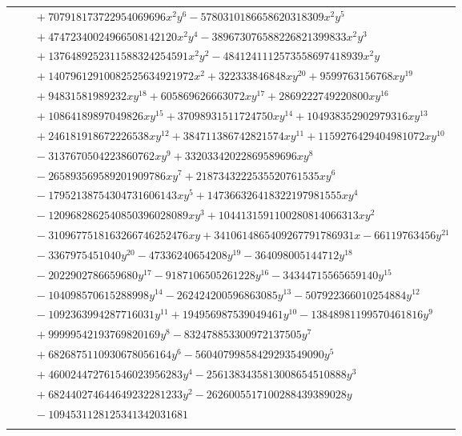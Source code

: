 \documentclass[11pt]{article}
\begin{document}
\begin{longtable}{@{}ll@{}}
 & $\quad +707918173722954069696x^{2}y^{6}-5780310186658620318309x^{2}y^{5}$\\
 & $\quad +47472340024966508142120x^{2}y^{4}-389673076588226821399833x^{2}y^{3}$\\
 & $\quad +1376489252311588324254591x^{2}y^{2}-4841241112573558697418939x^{2}y$\\
 & $\quad +14079612910082525634921972x^{2}+322333846848xy^{20}+9599763156768xy^{19}$\\
 & $\quad +94831581989232xy^{18}+605869626663072xy^{17}+2869222749220800xy^{16}$\\
 & $\quad +10864189897049826xy^{15}+37098931511724750xy^{14}+104938352902979316xy^{13}$\\
 & $\quad +246181918672226538xy^{12}+384711386742821574xy^{11}+1159276429404981072xy^{10}$\\
 & $\quad -3137670504223860762xy^{9}+33203342022869589696xy^{8}$\\
 & $\quad -265893569589201909786xy^{7}+2187343222535520761535xy^{6}$\\
 & $\quad -17952138754304731606143xy^{5}+147366326418322197981555xy^{4}$\\
 & $\quad -1209682862540850396028089xy^{3}+1044131591100280814066313xy^{2}$\\
 & $\quad -3109677518163266746252476xy+3410614865409267791786931x-66119763456y^{21}$\\
 & $\quad -3367975451040y^{20}-47336240654208y^{19}-364098005144712y^{18}$\\
 & $\quad -2022902786659680y^{17}-9187106505261228y^{16}-34344715565659140y^{15}$\\
 & $\quad -104098570615288998y^{14}-262424200596863085y^{13}-507922366010254884y^{12}$\\
 & $\quad -1092363994287716031y^{11}+194956987539049461y^{10}-13848981199570461816y^{9}$\\
 & $\quad +99999542193769820169y^{8}-832478853300972137505y^{7}$\\
 & $\quad +6826875110930678056164y^{6}-56040799858429293549090y^{5}$\\
 & $\quad +460024472761546023956283y^{4}-2561383435813008654510888y^{3}$\\
 & $\quad +682440274644649232281233y^{2}-2626005517100288439389028y$\\
 & $\quad -1094531128125341342031681$\\
\addlinespace[3pt]
\multicolumn{2}{@{}l}{$i=12$, $m=4$, neighbours $114,1,18,28,74$}\\

\end{longtable}
\end{document}
